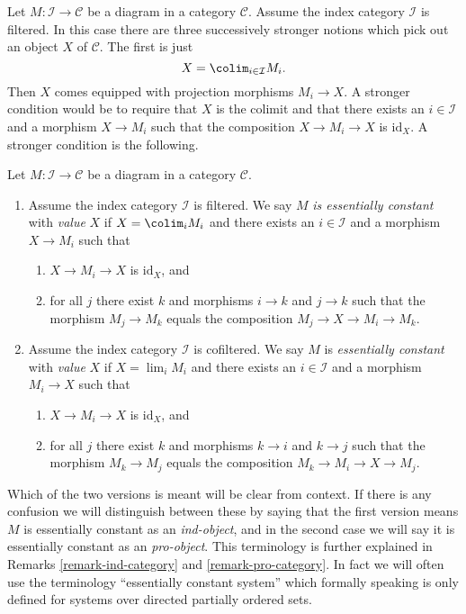 \noindent
Let $M : \mathcal{I} \to \mathcal{C}$ be a diagram in a category $\mathcal{C}$.
Assume the index category $\mathcal{I}$ is filtered. In this case
there are three successively stronger notions which pick out an object
$X$ of $\mathcal{C}$. The first is just
$$
X = \colim_{i \in \mathcal{I}} M_i.
$$
Then $X$ comes equipped with projection morphisms $M_i \to X$.
A stronger condition would be to require that $X$ is the colimit and
that there exists an $i \in \mathcal{I}$ and a morphism $X \to M_i$ such
that the composition $X \to M_i \to X$ is $\text{id}_X$. A stronger condition
is the following.

\begin{definition}
\label{definition-essentially-constant-diagram}
Let $M : \mathcal{I} \to \mathcal{C}$ be a diagram in a category
$\mathcal{C}$.
\begin{enumerate}
\item Assume the index category $\mathcal{I}$ is filtered.
We say $M$ {\it is essentially constant} with {\it value} $X$ if
$X = \colim_i M_i$ and there exists an $i \in \mathcal{I}$
and a morphism $X \to M_i$ such that
\begin{enumerate}
\item $X \to M_i \to X$ is $\text{id}_X$, and
\item for all $j$ there exist $k$ and morphisms $i \to k$ and $j \to k$
such that the morphism $M_j \to M_k$ equals the composition
$M_j \to X \to M_i \to M_k$.
\end{enumerate}
\item Assume the index category $\mathcal{I}$ is cofiltered. We say
$M$ is {\it essentially constant} with {\it value} $X$ if
$X = \lim_i M_i$ and there exists an $i \in \mathcal{I}$
and a morphism $M_i \to X$ such that
\begin{enumerate}
\item $X \to M_i \to X$ is $\text{id}_X$, and
\item for all $j$ there exist $k$ and morphisms $k \to i$ and $k \to j$
such that the morphism $M_k \to M_j$ equals the composition
$M_k \to M_i \to X \to M_j$.
\end{enumerate}
\end{enumerate}
\end{definition}

\noindent
Which of the two versions is meant will be clear from context. If there is
any confusion we will distinguish between these by saying that the first
version means $M$ is essentially constant as an {\it ind-object}, and in
the second case we will say it is essentially constant as an {\it pro-object}.
This terminology is further explained in
Remarks \ref{remark-ind-category} and \ref{remark-pro-category}.
In fact we will often use the terminology ``essentially constant system''
which formally speaking is only defined for systems over directed partially
ordered sets.

